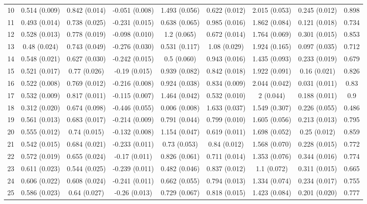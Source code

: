 \begin{tabular}{@{\extracolsep{5pt}} l cccccccc}
10 & 0.514 (0.009) & 0.842 (0.014) & -0.051 (0.008) & 1.493 (0.056) & 0.622 (0.012) & 2.015 (0.053) & 0.245 (0.012) & 0.898 \\ 
11 & 0.493 (0.014) & 0.738 (0.025) & -0.231 (0.015) & 0.638 (0.065) & 0.985 (0.016) & 1.862 (0.084) & 0.121 (0.018) & 0.734 \\ 
12 & 0.528 (0.013) & 0.778 (0.019) & -0.098 (0.010) & 1.2 (0.065) & 0.672 (0.014) & 1.764 (0.069) & 0.301 (0.015) & 0.853 \\ 
13 & 0.48 (0.024) & 0.743 (0.049) & -0.276 (0.030) & 0.531 (0.117) & 1.08 (0.029) & 1.924 (0.165) & 0.097 (0.035) & 0.712 \\ 
14 & 0.548 (0.021) & 0.627 (0.030) & -0.242 (0.015) & 0.5 (0.060) & 0.943 (0.016) & 1.435 (0.093) & 0.233 (0.019) & 0.679 \\ 
15 & 0.521 (0.017) & 0.77 (0.026) & -0.19 (0.015) & 0.939 (0.082) & 0.842 (0.018) & 1.922 (0.091) & 0.16 (0.021) & 0.826 \\ 
16 & 0.522 (0.008) & 0.769 (0.012) & -0.216 (0.008) & 0.924 (0.038) & 0.834 (0.009) & 2.044 (0.042) & 0.031 (0.011) & 0.83 \\ 
17 & 0.532 (0.009) & 0.817 (0.011) & -0.115 (0.007) & 1.464 (0.042) & 0.532 (0.010) & 2 (0.044) & 0.188 (0.011) & 0.9 \\ 
18 & 0.312 (0.020) & 0.674 (0.098) & -0.446 (0.055) & 0.006 (0.008) & 1.633 (0.037) & 1.549 (0.307) & 0.226 (0.055) & 0.486 \\ 
19 & 0.561 (0.013) & 0.683 (0.017) & -0.214 (0.009) & 0.791 (0.044) & 0.799 (0.010) & 1.605 (0.056) & 0.213 (0.013) & 0.795 \\ 
20 & 0.555 (0.012) & 0.74 (0.015) & -0.132 (0.008) & 1.154 (0.047) & 0.619 (0.011) & 1.698 (0.052) & 0.25 (0.012) & 0.859 \\ 
21 & 0.542 (0.015) & 0.684 (0.021) & -0.233 (0.011) & 0.73 (0.053) & 0.84 (0.012) & 1.568 (0.070) & 0.228 (0.015) & 0.772 \\ 
22 & 0.572 (0.019) & 0.655 (0.024) & -0.17 (0.011) & 0.826 (0.061) & 0.711 (0.014) & 1.353 (0.076) & 0.344 (0.016) & 0.774 \\ 
23 & 0.611 (0.023) & 0.544 (0.025) & -0.239 (0.011) & 0.482 (0.046) & 0.837 (0.012) & 1.1 (0.072) & 0.311 (0.015) & 0.665 \\ 
24 & 0.606 (0.022) & 0.608 (0.024) & -0.241 (0.011) & 0.662 (0.055) & 0.794 (0.013) & 1.334 (0.074) & 0.234 (0.017) & 0.755 \\ 
25 & 0.586 (0.023) & 0.64 (0.027) & -0.26 (0.013) & 0.729 (0.067) & 0.818 (0.015) & 1.423 (0.084) & 0.201 (0.020) & 0.777 \\ 

\end{tabular}
